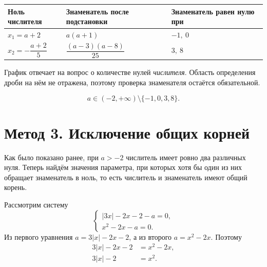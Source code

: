 \begin{center}
  \renewcommand{\arraystretch}{1.42}
  \begin{tabularx}{\textwidth}{
      >{\centering\arraybackslash}p{}
      >{\centering\arraybackslash}p{}
      >{\centering\arraybackslash}X
    }
    \toprule
    \rowcolor{TableHeader}
    Ноль числителя & Знаменатель после подстановки &
      Знаменатель равен нулю при \\
    \midrule
    \(x_1=a+2\) & \(a(a+1)\) & \(-1,\ 0\) \\
    \addlinespace[0.25em]
    \(x_2=-\dfrac{a+2}{5}\) & \(\dfrac{(a-3)(a-8)}{25}\) & \(3,\ 8\) \\
    \bottomrule
  \end{tabularx}
\end{center}

\begin{warningbox}
  График отвечает на вопрос о количестве нулей \emph{числителя}. Область
  определения дроби на нём не отражена, поэтому проверка знаменателя остаётся
  обязательной.
\end{warningbox}

\begin{resultbox}
  \[
    \boxed{a\in(-2,+\infty)\setminus\{-1,0,3,8\}}.
  \]
\end{resultbox}

\section{Метод 3. Исключение общих корней}

\begin{methodintro}
  Как было показано ранее, при \(a>-2\) числитель имеет ровно два различных
  нуля. Теперь найдём значения параметра, при которых хотя бы один из них
  обращает знаменатель в ноль, то есть числитель и знаменатель имеют общий
  корень.
\end{methodintro}

Рассмотрим систему
\[
  \begin{cases}
    |3x|-2x-2-a=0,\\
    x^2-2x-a=0.
  \end{cases}
\]
Из первого уравнения \(a=3|x|-2x-2\), а из второго \(a=x^2-2x\). Поэтому
\[
  \begin{aligned}
    3|x|-2x-2&=x^2-2x,\\
    3|x|-2&=x^2.
  \end{aligned}
\]

